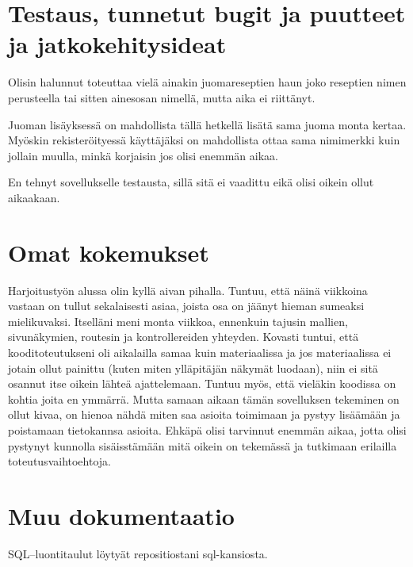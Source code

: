 \documentclass[a4paper]{article}
\begin{document}
\section{Testaus, tunnetut bugit ja puutteet ja jatkokehitysideat}
Olisin halunnut toteuttaa vielä ainakin juomareseptien haun joko reseptien nimen perusteella tai sitten ainesosan nimellä, mutta aika ei riittänyt. 

Juoman lisäyksessä on mahdollista tällä hetkellä lisätä sama juoma monta kertaa. Myöskin rekisteröityessä käyttäjäksi on mahdollista ottaa sama nimimerkki kuin jollain muulla, minkä korjaisin jos olisi enemmän aikaa. 

En tehnyt sovellukselle testausta, sillä sitä ei vaadittu eikä olisi oikein ollut aikaakaan.

\section{Omat kokemukset}
Harjoitustyön alussa olin kyllä aivan pihalla. Tuntuu, että näinä viikkoina vastaan on tullut sekalaisesti asiaa, joista osa on jäänyt hieman sumeaksi mielikuvaksi. Itselläni meni monta viikkoa, ennenkuin tajusin mallien, sivunäkymien, routesin ja kontrollereiden yhteyden. Kovasti tuntui, että kooditoteutukseni oli aikalailla samaa kuin materiaalissa ja jos materiaalissa ei jotain ollut painittu (kuten miten ylläpitäjän näkymät luodaan), niin ei sitä osannut itse oikein lähteä ajattelemaan. Tuntuu myös, että vieläkin koodissa on kohtia joita en ymmärrä. Mutta samaan aikaan tämän sovelluksen tekeminen on ollut kivaa, on hienoa nähdä miten saa asioita toimimaan ja pystyy lisäämään ja poistamaan tietokannsa asioita. Ehkäpä olisi tarvinnut enemmän aikaa, jotta olisi pystynyt kunnolla sisäisstämään mitä oikein on tekemässä ja tutkimaan erilailla toteutusvaihtoehtoja.

\section{Muu dokumentaatio}

SQL--luontitaulut löytyät repositiostani sql-kansiosta.
\end{document}
